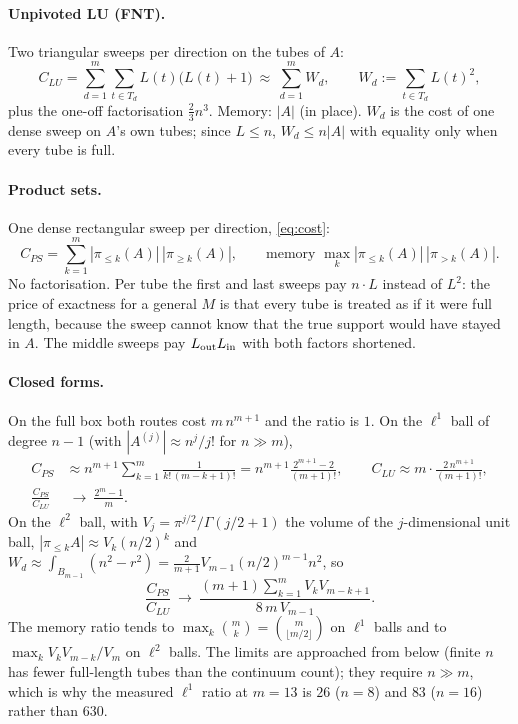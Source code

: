 \documentclass[11pt]{article}
\newcommand{\pr}[1]{\pi_{#1}}
\begin{document}
\paragraph{Unpivoted LU (FNT).} Two triangular sweeps per direction on the tubes of $A$:
\begin{equation}\label{eq:clu}
 C_{LU}=\sum_{d=1}^{m}\sum_{t\in T_d}L(t)\big(L(t)+1\big)\ \approx\ \sum_{d=1}^m W_d,\qquad W_d:=\sum_{t\in T_d}L(t)^2,
\end{equation}
plus the one-off factorisation $\tfrac23n^3$. Memory: $|A|$ (in place). $W_d$ is the cost of one dense sweep on $A$'s own
tubes; since $L\le n$, $W_d\le n|A|$ with equality only when every tube is full.

\paragraph{Product sets.} One dense rectangular sweep per direction, \eqref{eq:cost}:
\[
 C_{PS}=\sum_{k=1}^{m}|\pr{\le k}(A)|\,|\pr{\ge k}(A)|,\qquad \text{memory }\max_k|\pr{\le k}(A)|\,|\pr{>k}(A)| .
\]
No factorisation. Per tube the first and last sweeps pay $n\cdot L$ instead of $L^2$: the price of exactness for a
general $M$ is that every tube is treated as if it were full length, because the sweep cannot know that the true
support would have stayed in $A$. The middle sweeps pay $L_{\rm out}L_{\rm in}$ with both factors shortened.

\paragraph{Closed forms.} On the full box both routes cost $m\,n^{m+1}$ and the ratio is $1$. On the $\ell^1$ ball of degree
$n-1$ (with $|A^{(j)}|\approx n^j/j!$ for $n\gg m$),
\begin{align*}
 C_{PS}&\approx n^{m+1}\sum_{k=1}^m\frac{1}{k!\,(m-k+1)!}=n^{m+1}\frac{2^{m+1}-2}{(m+1)!},\qquad
 C_{LU}\approx m\cdot\frac{2\,n^{m+1}}{(m+1)!},\\
 \frac{C_{PS}}{C_{LU}}&\ \longrightarrow\ \frac{2^m-1}{m}.
\end{align*}
On the $\ell^2$ ball, with $V_j=\pi^{j/2}/\Gamma(j/2+1)$ the volume of the $j$-dimensional unit ball,
$|\pr{\le k}A|\approx V_k(n/2)^k$ and $W_d\approx\int_{B_{m-1}}(n^2-r^2)=\frac{2}{m+1}V_{m-1}(n/2)^{m-1}n^2$, so
\[
 \frac{C_{PS}}{C_{LU}}\ \longrightarrow\ \frac{(m+1)\sum_{k=1}^{m}V_kV_{m-k+1}}{8\,m\,V_{m-1}} .
\]
The memory ratio tends to $\max_k\binom{m}{k}=\binom{m}{\lfloor m/2\rfloor}$ on $\ell^1$ balls and to $\max_kV_kV_{m-k}/V_m$ on $\ell^2$ balls.
The limits are approached from below (finite $n$ has fewer full-length tubes than the continuum count); they
require $n\gg m$, which is why the measured $\ell^1$ ratio at $m=13$ is $26$ ($n=8$) and $83$ ($n=16$) rather than $630$.
\end{document}
